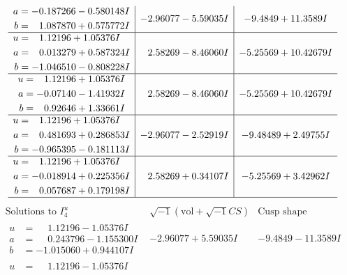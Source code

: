 \documentclass[1p]{elsarticle_modified}
\theoremstyle{definition}
\newcommand{\I}{\sqrt{-1}}
\begin{document}
$$\begin{array}{c|c|c}
\begin{aligned}
a &= -0.187266 - 0.580148 I \\
b &= \phantom{-}1.087870 + 0.575772 I\end{aligned}
 & -2.96077 - 5.59035 I & -9.4849 + 11.3589 I \\ \hline\begin{aligned}
u &= \phantom{-}1.12196 + 1.05376 I \\
a &= \phantom{-}0.013279 + 0.587324 I \\
b &= -1.046510 - 0.808228 I\end{aligned}
 & \phantom{-}2.58269 - 8.46060 I & -5.25569 + 10.42679 I \\ \hline\begin{aligned}
u &= \phantom{-}1.12196 + 1.05376 I \\
a &= -0.07140 - 1.41932 I \\
b &= \phantom{-}0.92646 + 1.33661 I\end{aligned}
 & \phantom{-}2.58269 - 8.46060 I & -5.25569 + 10.42679 I \\ \hline\begin{aligned}
u &= \phantom{-}1.12196 + 1.05376 I \\
a &= \phantom{-}0.481693 + 0.286853 I \\
b &= -0.965395 - 0.181113 I\end{aligned}
 & -2.96077 - 2.52919 I & -9.48489 + 2.49755 I \\ \hline\begin{aligned}
u &= \phantom{-}1.12196 + 1.05376 I \\
a &= -0.018914 + 0.225356 I \\
b &= \phantom{-}0.057687 + 0.179198 I\end{aligned}
 & \phantom{-}2.58269 + 0.34107 I & -5.25569 + 3.42962 I\\
 \hline 
 \end{array}$$\newpage$$\begin{array}{c|c|c}  
\text{Solutions to }I^u_{4}& \I (\text{vol} + \sqrt{-1}CS) & \text{Cusp shape}\\
 \hline 
\begin{aligned}
u &= \phantom{-}1.12196 - 1.05376 I \\
a &= \phantom{-}0.243796 - 1.155300 I \\
b &= -1.015060 + 0.944107 I\end{aligned}
 & -2.96077 + 5.59035 I & -9.4849 - 11.3589 I \\ \hline\begin{aligned}
u &= \phantom{-}1.12196 - 1.05376 I \\

\end{aligned}
\end{array}$$
\end{document}
